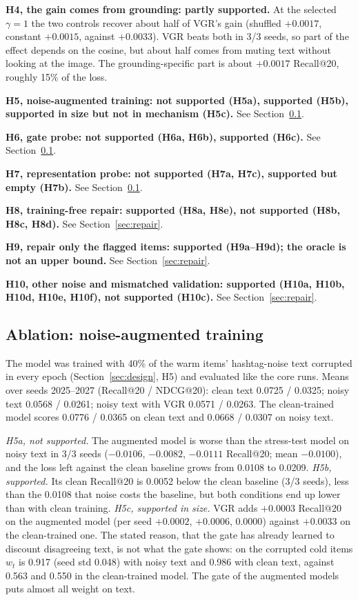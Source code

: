\documentclass[conference]{IEEEtran}
\begin{document}
\textbf{H4, the gain comes from grounding: partly supported.} At the selected $\gamma = 1$ the two controls recover about half of VGR's gain (shuffled $+0.0017$, constant $+0.0015$, against $+0.0033$). VGR beats both in 3/3 seeds, so part of the effect depends on the cosine, but about half comes from muting text without looking at the image. The grounding-specific part is about $+0.0017$ Recall@20, roughly 15\% of the loss.

\textbf{H5, noise-augmented training: not supported (H5a), supported (H5b), supported in size but not in mechanism (H5c).} See Section~\ref{sec:ablation}.

\textbf{H6, gate probe: not supported (H6a, H6b), supported (H6c).} See Section~\ref{sec:ablation}.

\textbf{H7, representation probe: not supported (H7a, H7c), supported but empty (H7b).} See Section~\ref{sec:ablation}.

\textbf{H8, training-free repair: supported (H8a, H8e), not supported (H8b, H8c, H8d).} See Section~\ref{sec:repair}.

\textbf{H9, repair only the flagged items: supported (H9a--H9d); the oracle is not an upper bound.} See Section~\ref{sec:repair}.

\textbf{H10, other noise and mismatched validation: supported (H10a, H10b, H10d, H10e, H10f), not supported (H10c).} See Section~\ref{sec:repair}.

\subsection{Ablation: noise-augmented training}
\label{sec:ablation}

The model was trained with 40\% of the warm items' hashtag-noise text corrupted in every epoch (Section~\ref{sec:design}, H5) and evaluated like the core runs. Means over seeds 2025--2027 (Recall@20 / NDCG@20): clean text 0.0725 / 0.0325; noisy text 0.0568 / 0.0261; noisy text with VGR 0.0571 / 0.0263. The clean-trained model scores 0.0776 / 0.0365 on clean text and 0.0668 / 0.0307 on noisy text.

\emph{H5a, not supported.} The augmented model is worse than the stress-test model on noisy text in 3/3 seeds ($-0.0106$, $-0.0082$, $-0.0111$ Recall@20; mean $-0.0100$), and the loss left against the clean baseline grows from 0.0108 to 0.0209. \emph{H5b, supported.} Its clean Recall@20 is 0.0052 below the clean baseline (3/3 seeds), less than the 0.0108 that noise costs the baseline, but both conditions end up lower than with clean training. \emph{H5c, supported in size.} VGR adds $+0.0003$ Recall@20 on the augmented model (per seed $+0.0002$, $+0.0006$, $0.0000$) against $+0.0033$ on the clean-trained one. The stated reason, that the gate has already learned to discount disagreeing text, is not what the gate shows: on the corrupted cold items $w_t$ is 0.917 (seed std 0.048) with noisy text and 0.986 with clean text, against 0.563 and 0.550 in the clean-trained model. The gate of the augmented models puts almost all weight on text.
\end{document}
